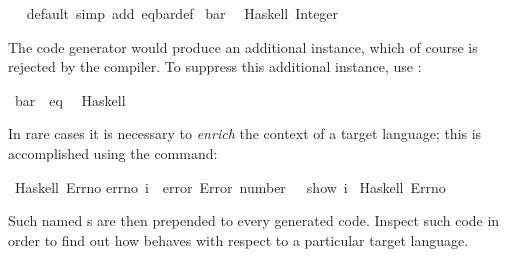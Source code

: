 \begin{isabellebody}
\isanewline
{}\isamarkupfalse%
\ \isamarkupfalse%
\ default\ {\isacharparenleft}simp\ add{\isacharcolon}\ eq{\isacharunderscore}bar{\isacharunderscore}def{\isacharparenright}\isanewline
\isanewline
{}\isamarkupfalse%
%
\endisatagquote
{\isafoldquote}%
%
\isadelimquote
%
\endisadelimquote
\isanewline
%
\isadelimquotett
%
\endisadelimquotett
%
\isatagquotett
{}\isamarkupfalse%
\ bar\isanewline
\ \ {\isacharparenleft}Haskell\ {\isachardoublequoteopen}Integer{\isachardoublequoteclose}{\isacharparenright}%
\endisatagquotett
{\isafoldquotett}%
%
\isadelimquotett
%
\endisadelimquotett
%
\begin{isamarkuptext}%
\noindent The code generator would produce
  an additional instance, which of course is rejected by the 
  compiler.
  To suppress this additional instance, use
  :%
\end{isamarkuptext}%
\isamarkuptrue%
%
\isadelimquotett
%
\endisadelimquotett
%
\isatagquotett
{}\isamarkupfalse%
\ bar\ {\isacharcolon}{\isacharcolon}\ eq\isanewline
\ \ {\isacharparenleft}Haskell\ {\isacharminus}{\isacharparenright}%
\endisatagquotett
{\isafoldquotett}%
%
\isadelimquotett
%
\endisadelimquotett
%
\isamarkuptrue%
%
\begin{isamarkuptext}%
In rare cases it is necessary to \emph{enrich} the context of a
  target language;  this is accomplished using the \hyperlink{command.code-include}{\mbox{}}
  command:%
\end{isamarkuptext}%
\isamarkuptrue%
%
\isadelimquotett
%
\endisadelimquotett
%
\isatagquotett
{}\isamarkupfalse%
\ Haskell\ {\isachardoublequoteopen}Errno{\isachardoublequoteclose}\isanewline
{\isacharverbatimopen}errno\ i\ {\isacharequal}\ error\ {\isacharparenleft}{\isachardoublequote}Error\ number{\isacharcolon}\ {\isachardoublequote}\ {\isacharplus}{\isacharplus}\ show\ i{\isacharparenright}{\isacharverbatimclose}\isanewline
\isanewline
{}\isamarkupfalse%
\ Haskell\ Errno%
\endisatagquotett
{\isafoldquotett}%
%
\isadelimquotett
%
\endisadelimquotett
%
\begin{isamarkuptext}%
\noindent Such named s are then prepended to every generated code.
  Inspect such code in order to find out how \hyperlink{command.code-include}{\mbox{}} behaves
  with respect to a particular target language.%
\end{isamarkuptext}%
\isamarkuptrue%
%
\isadelimtheory
%
\endisadelimtheory
%
\isatagtheory
{}\isamarkupfalse%
%
\endisatagtheory
{\isafoldtheory}%
%
\isadelimtheory
%
\endisadelimtheory
\isanewline
\end{isabellebody}%

